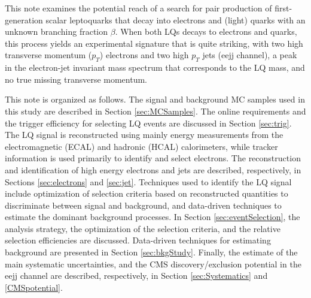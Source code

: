 This note examines the potential reach of a search for
pair production of first-generation 
scalar leptoquarks that decay into electrons and 
(light) quarks with an unknown branching fraction $\beta$.
When both LQs decays to electrons and quarks,
this process yields an experimental signature that
is quite striking, with two 
high transverse momentum ($p_T$) electrons 
and two high $p_T$ jets (eejj channel),
a peak in the electron-jet invariant mass 
spectrum that corresponds to the LQ mass, and 
no true missing transverse momentum.

%
This note is organized as follows. 
The signal and background MC samples used in this study are described in Section \ref{sec:MCSamples}.
The online requirements and the trigger efficiency for selecting LQ events are discussed in Section \ref{sec:trig}.
The LQ signal is reconstructed using mainly energy measurements from the
electromagnetic (ECAL) and hadronic (HCAL) calorimeters, while tracker information 
is used primarily to identify and select electrons. 
The reconstruction and identification of high energy electrons and jets are described, respectively, 
in Sections \ref{sec:electrons} and \ref{sec:jet}.
Techniques used to identify the LQ signal include optimization of selection criteria based on 
reconstructed quantities to discriminate between signal and background, 
and data-driven techniques to estimate the dominant background processes.
In Section \ref{sec:eventSelection}, the analysis strategy, the optimization of the selection criteria, 
and the relative selection efficiencies are discussed. 
Data-driven techniques for estimating background are presented in Section \ref{sec:bkgStudy}.
Finally, the estimate of the main systematic uncertainties, and the CMS discovery/exclusion potential 
in the eejj channel are described, respectively, in Section \ref{sec:Systematics} and \ref{CMSpotential}.




%
